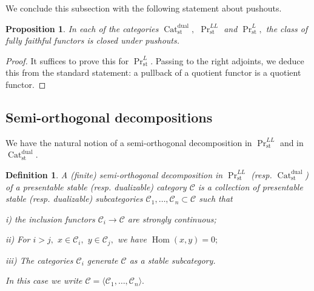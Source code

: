 \documentclass[11pt,leqno]{amsart}
\newtheorem{defi}[theo]{Definition}
\newtheorem{prop}[theo]{Proposition}
\numberwithin{equation}{section}
\def\Hom{\operatorname{Hom}}
\newcommand{\Cat}{\operatorname{Cat}}
\newcommand{\st}{\operatorname{st}}
\newcommand{\dual}{\operatorname{dual}}
\newcommand{\cC}{{\mathcal C}}
\begin{document}
We conclude this subsection with the following statement about pushouts.

\begin{prop}\label{prop:pushouts_of_mono} In each of the categories $\Cat_{\st}^{\dual},$ $\Pr_{\st}^{LL}$ and $\Pr_{\st}^L,$ the class of fully faithful functors is closed under pushouts.\end{prop}

\begin{proof}It suffices to prove this for $\Pr^L_{\st}.$ Passing to the right adjoints, we deduce this from the standard statement: a pullback of a quotient functor is a quotient functor.\end{proof}

\subsection{Semi-orthogonal decompositions}
\label{ssec:SOD}

We have the natural notion of a semi-orthogonal decomposition in $\Pr_{\st}^{LL}$ and in $\Cat_{\st}^{\dual}.$

\begin{defi}A (finite) semi-orthogonal decomposition in $\Pr^{LL}_{\st}$ (resp. $\Cat_{\st}^{\dual}$) of a presentable stable (resp. dualizable) category $\cC$ is a collection of presentable stable (resp. dualizable) subcategories $\cC_1,\dots,\cC_n\subset\cC$ such that 

i) the inclusion functors $\cC_i\to\cC$ are strongly continuous;

ii) For $i>j,$ $x\in \cC_i,$ $y\in\cC_j,$ we have $\Hom(x,y)=0;$

iii) The categories $\cC_i$ generate $\cC$ as a stable subcategory.

In this case we write $\cC=\langle\cC_1,\dots,\cC_n\rangle.$\end{defi}
\end{document}
